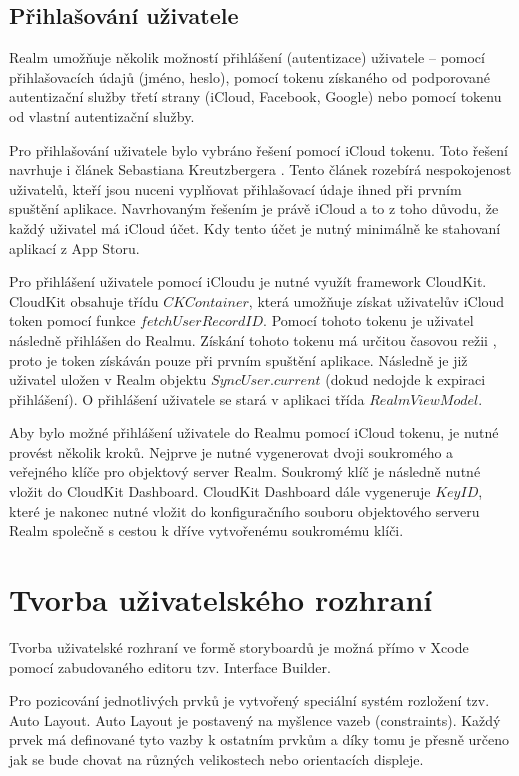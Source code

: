 \documentclass[thesis=M,czech]{FITthesis}[2012/06/26]
\begin{document}
\subsection{Přihlašování uživatele}
\label{chap:login}
Realm umožňuje několik možností přihlášení (autentizace) uživatele -- pomocí přihlašovacích údajů (jméno, heslo), pomocí tokenu získaného od podporované autentizační služby třetí strany (iCloud, Facebook, Google) nebo pomocí tokenu od vlastní autentizační služby. \cite{realmDocs}

Pro přihlašování uživatele bylo vybráno řešení pomocí iCloud tokenu. Toto řešení navrhuje i článek Sebastiana Kreutzbergera \cite{loginUX}. Tento článek rozebírá nespokojenost uživatelů, kteří jsou nuceni vyplňovat přihlašovací údaje ihned při prvním spuštění aplikace. Navrhovaným řešením je právě iCloud a to z toho důvodu, že každý uživatel má iCloud účet.  Kdy tento účet je nutný minimálně ke stahovaní aplikací z App Storu.

Pro přihlášení uživatele pomocí iCloudu je nutné využít framework CloudKit. CloudKit obsahuje třídu $CKContainer$, která umožňuje získat uživatelův iCloud token pomocí funkce $fetchUserRecordID$. \cite{ckcontainer} Pomocí tohoto tokenu je uživatel následně přihlášen do Realmu. Získání tohoto tokenu má určitou časovou režii \cite{ckcontainer}, proto je token získáván pouze při prvním spuštění aplikace. Následně je již uživatel uložen v Realm objektu $SyncUser.current$ (dokud nedojde k expiraci přihlášení). O přihlášení uživatele se stará v aplikaci třída $RealmViewModel$.

Aby bylo možné přihlášení uživatele do Realmu pomocí iCloud tokenu, je nutné provést několik kroků. Nejprve je nutné vygenerovat dvoji soukromého a veřejného klíče pro objektový server Realm. Soukromý klíč je následně nutné vložit do CloudKit Dashboard. CloudKit Dashboard dále vygeneruje $Key ID$, které je nakonec nutné vložit do konfiguračního souboru objektového serveru Realm společně s cestou k dříve vytvořenému soukromému klíči. \cite{realmObjS}

\section{Tvorba uživatelského rozhraní}
Tvorba uživatelské rozhraní ve formě storyboardů je možná přímo v Xcode pomocí zabudovaného editoru tzv. Interface Builder.

Pro pozicování jednotlivých prvků je vytvořený speciální systém rozložení tzv. Auto Layout. Auto Layout je postavený na myšlence vazeb (constraints). Každý prvek má definované tyto vazby k ostatním prvkům a díky tomu je přesně určeno jak se bude chovat na různých velikostech nebo orientacích displeje. \cite{ib}
\end{document}
